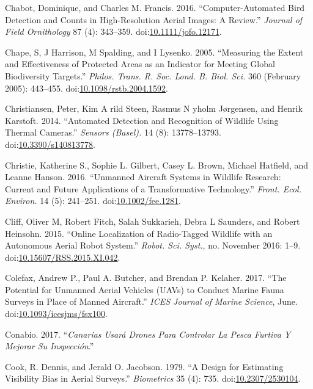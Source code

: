 \documentclass[]{interact}
\theoremstyle{plain}%
\theoremstyle{definition}
\theoremstyle{remark}
\begin{document}
\hypertarget{ref-chabot_computer-automated_2016}{}
Chabot, Dominique, and Charles M. Francis. 2016. ``Computer-Automated
Bird Detection and Counts in High-Resolution Aerial Images: A Review.''
\emph{Journal of Field Ornithology} 87 (4): 343--359.
doi:\href{https://doi.org/10.1111/jofo.12171}{10.1111/jofo.12171}.

\hypertarget{ref-chape_measuring_2005}{}
Chape, S, J Harrison, M Spalding, and I Lysenko. 2005. ``Measuring the
Extent and Effectiveness of Protected Areas as an Indicator for Meeting
Global Biodiversity Targets.'' \emph{Philos. Trans. R. Soc. Lond. B.
Biol. Sci.} 360 (February 2005): 443--455.
doi:\href{https://doi.org/10.1098/rstb.2004.1592}{10.1098/rstb.2004.1592}.

\hypertarget{ref-christiansen_automated_2014}{}
Christiansen, Peter, Kim A rild Steen, Rasmus N yholm Jørgensen, and
Henrik Karstoft. 2014. ``Automated Detection and Recognition of Wildlife
Using Thermal Cameras.'' \emph{Sensors (Basel).} 14 (8): 13778--13793.
doi:\href{https://doi.org/10.3390/s140813778}{10.3390/s140813778}.

\hypertarget{ref-christie_unmanned_2016}{}
Christie, Katherine S., Sophie L. Gilbert, Casey L. Brown, Michael
Hatfield, and Leanne Hanson. 2016. ``Unmanned Aircraft Systems in
Wildlife Research: Current and Future Applications of a Transformative
Technology.'' \emph{Front. Ecol. Environ.} 14 (5): 241--251.
doi:\href{https://doi.org/10.1002/fee.1281}{10.1002/fee.1281}.

\hypertarget{ref-cliff_online_2015}{}
Cliff, Oliver M, Robert Fitch, Salah Sukkarieh, Debra L Saunders, and
Robert Heinsohn. 2015. ``Online Localization of Radio-Tagged Wildlife
with an Autonomous Aerial Robot System.'' \emph{Robot. Sci. Syst.}, no.
November 2016: 1--9.
doi:\href{https://doi.org/10.15607/RSS.2015.XI.042}{10.15607/RSS.2015.XI.042}.

\hypertarget{ref-colefax_potential_2017}{}
Colefax, Andrew P., Paul A. Butcher, and Brendan P. Kelaher. 2017. ``The
Potential for Unmanned Aerial Vehicles (UAVs) to Conduct Marine Fauna
Surveys in Place of Manned Aircraft.'' \emph{ICES Journal of Marine
Science}, June.
doi:\href{https://doi.org/10.1093/icesjms/fsx100}{10.1093/icesjms/fsx100}.

\hypertarget{ref-Conabio2017}{}
Conabio. 2017. ``\emph{Canarias Usará Drones Para Controlar La Pesca
Furtiva Y Mejorar Su Inspección}.''

\hypertarget{ref-cook_design_1979}{}
Cook, R. Dennis, and Jerald O. Jacobson. 1979. ``A Design for Estimating
Visibility Bias in Aerial Surveys.'' \emph{Biometrics} 35 (4): 735.
doi:\href{https://doi.org/10.2307/2530104}{10.2307/2530104}.
\end{document}
